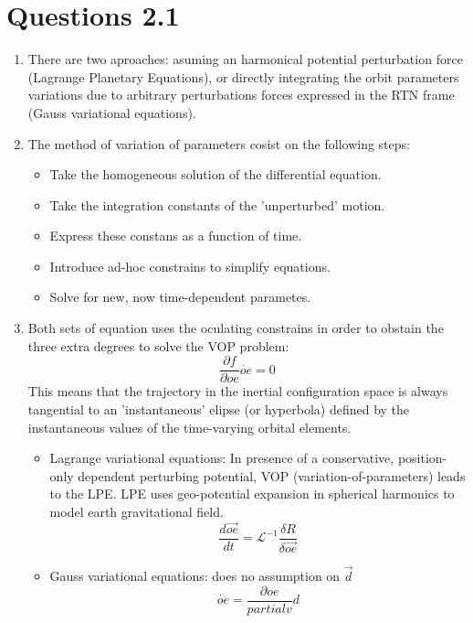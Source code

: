 \documentclass[a4paper]{article}
\begin{document}
\section{Questions 2.1}
\begin{enumerate}[label=\emph{\alph*)}]
  \item %
    There are two aproaches: asuming an harmonical potential perturbation force (Lagrange Planetary Equations), or directly integrating the orbit parameters variations due to arbitrary perturbations forces expressed in the RTN frame (Gauss variational equations).
  \item %
    The method of variation of parameters cosist on the following steps:
    \begin{itemize}
      \item Take the homogeneous solution of the differential equation.
      \item Take the integration constants of the 'unperturbed' motion.
      \item Express these constans as a function of time.
      \item Introduce ad-hoc constrains to simplify equations.
      \item Solve for new, now time-dependent parametes.
    \end{itemize}
  \item %
    Both sets of equation uses the oculating constrains in order to obstain the three extra degrees to solve the VOP problem:
    \[\frac{\partial f}{\partial oe} \dot{oe} = 0\]
    This means that the trajectory in the inertial configuration space is always tangential to an 'instantaneous' elipse (or hyperbola) defined by the instantaneous values of the time-varying orbital elements.
    \begin{itemize}
      \item Lagrange variational equations: In presence of a conservative, position-only dependent perturbing potential, VOP (variation-of-parameters) leads to the LPE. LPE uses geo-potential expansion in spherical harmonics to model earth gravitational field.
	\[\frac{d\vec{oe}}{dt} = \mathscr{L}^{-1}\frac{\delta R}{\delta \vec{oe}} \]
      \item Gauss variational equations: does no assumption on $\vec{d}$
	\[\dot{oe}=\frac{\partial oe}{partial v} d\]
    \end{itemize}
  

\end{enumerate}
\end{document}
